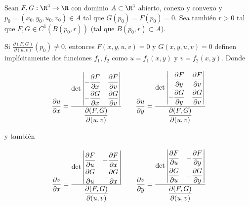\begin{teo}
    Sean $F, G: \R^4 \rightarrow \R$ con dominio $A \subset \R^4$ abierto, conexo y convexo y $p_0 = (x_0, y_0, u_0, v_0) \in A$ tal que $G(p_0) = F(p_0) = 0$. Sea también $r > 0$ tal que $F, G \in C^1\left( B(p_0, r) \right)$ (tal que $B(p_0, r) \subset A$).
    
    Si $\frac{\partial(F,G)}{\partial(u,v)}(p_0) \neq 0$, entonces $F(x,y,u,v) = 0$ y $G(x,y,u,v) = 0$ definen implícitamente dos funciones $f_1, f_2$ como $u = f_1(x,y)$ y $v = f_2(x,y)$. Donde
    
    \[
    \dfrac{\partial u}{\partial x} = \dfrac{
    \det \renewcommand\arraystretch{2}\begin{vmatrix}
             - \dfrac{\partial F}{\partial x} & \dfrac{\partial F}{\partial v} \\
             - \dfrac{\partial G}{\partial x} & \dfrac{\partial G}{\partial v} \\
         \end{vmatrix}
    }{\dfrac{\partial (F,G)}{\partial (u,v)}}
    \qquad
    \dfrac{\partial u}{\partial y} = \dfrac{
    \det \renewcommand\arraystretch{2}\begin{vmatrix}
             - \dfrac{\partial F}{\partial y} & \dfrac{\partial F}{\partial v} \\
             - \dfrac{\partial G}{\partial y} & \dfrac{\partial G}{\partial v} \\
         \end{vmatrix}
    }{\dfrac{\partial (F,G)}{\partial (u,v)}}
    \]
    
    \noindent y también
    
    \[
    \dfrac{\partial v}{\partial x} = \dfrac{
    \det \renewcommand\arraystretch{2}\begin{vmatrix}
             \dfrac{\partial F}{\partial u} & -\dfrac{\partial F}{\partial x} \\
             \dfrac{\partial G}{\partial u} & -\dfrac{\partial G}{\partial x} \\
         \end{vmatrix}
    }{\dfrac{\partial (F,G)}{\partial (u,v)}}
    \qquad
    \dfrac{\partial v}{\partial y} = \dfrac{
    \det \renewcommand\arraystretch{2}\begin{vmatrix}
             \dfrac{\partial F}{\partial u} & -\dfrac{\partial F}{\partial y} \\
             \dfrac{\partial G}{\partial u} & -\dfrac{\partial G}{\partial y} \\
         \end{vmatrix}
    }{\dfrac{\partial (F,G)}{\partial (u,v)}}
    \]
\end{teo}


